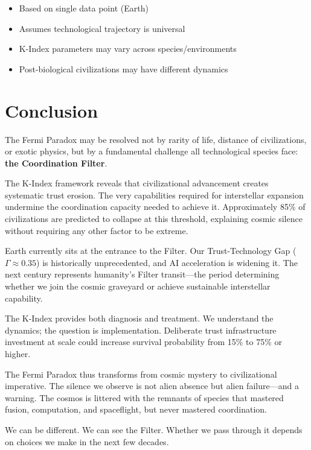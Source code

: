 \documentclass[11pt,a4paper]{article}
\begin{document}
\begin{itemize}
    \item Based on single data point (Earth)
    \item Assumes technological trajectory is universal
    \item K-Index parameters may vary across species/environments
    \item Post-biological civilizations may have different dynamics
\end{itemize}

\section{Conclusion}

The Fermi Paradox may be resolved not by rarity of life, distance of civilizations, or exotic physics, but by a fundamental challenge all technological species face: \textbf{the Coordination Filter}.

The K-Index framework reveals that civilizational advancement creates systematic trust erosion. The very capabilities required for interstellar expansion undermine the coordination capacity needed to achieve it. Approximately 85\% of civilizations are predicted to collapse at this threshold, explaining cosmic silence without requiring any other factor to be extreme.

Earth currently sits at the entrance to the Filter. Our Trust-Technology Gap ($\Gamma \approx 0.35$) is historically unprecedented, and AI acceleration is widening it. The next century represents humanity's Filter transit---the period determining whether we join the cosmic graveyard or achieve sustainable interstellar capability.

The K-Index provides both diagnosis and treatment. We understand the dynamics; the question is implementation. Deliberate trust infrastructure investment at scale could increase survival probability from 15\% to 75\% or higher.

The Fermi Paradox thus transforms from cosmic mystery to civilizational imperative. The silence we observe is not alien absence but alien failure---and a warning. The cosmos is littered with the remnants of species that mastered fusion, computation, and spaceflight, but never mastered coordination.

We can be different. We can see the Filter. Whether we pass through it depends on choices we make in the next few decades.
\end{document}
